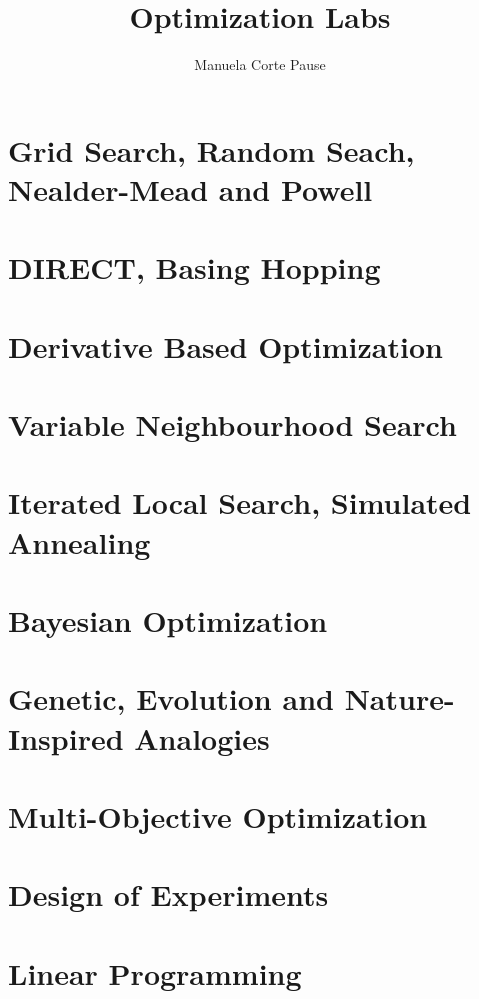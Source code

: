 \documentclass{article}
\title{Optimization Labs}
\author{Manuela Corte Pause}
\begin{document}
\maketitle

\tableofcontents
\newpage

\section{Grid Search, Random Seach, Nealder-Mead and Powell}

\newpage

\section{DIRECT, Basing Hopping}

\newpage

\section{Derivative Based Optimization}

\newpage

\section{Variable Neighbourhood Search}

\newpage

\section{Iterated Local Search, Simulated Annealing}

\newpage

\section{Bayesian Optimization}

\newpage

\section{Genetic, Evolution and Nature-Inspired Analogies}

\newpage

\section{Multi-Objective Optimization}

\newpage

\section{Design of Experiments}

\newpage

\section{Linear Programming}

\newpage
\end{document}
